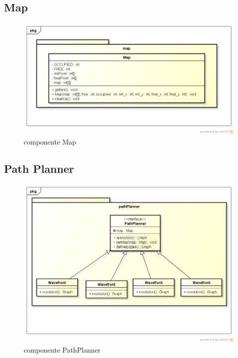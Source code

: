 \subsection{Map}

\begin{figure}[h]
	\centering
	\label{fig22}
		\includegraphics[keepaspectratio=true,scale=0.5]{figuras/pkgmap.png}
	\caption{componente Map}
\end{figure}

\subsection{Path Planner}

\begin{figure}[h]
	\centering
	\label{fig23}
		\includegraphics[keepaspectratio=true,scale=0.5]{figuras/pkgpathplanner.png}
	\caption{componente PathPlanner}
\end{figure}

